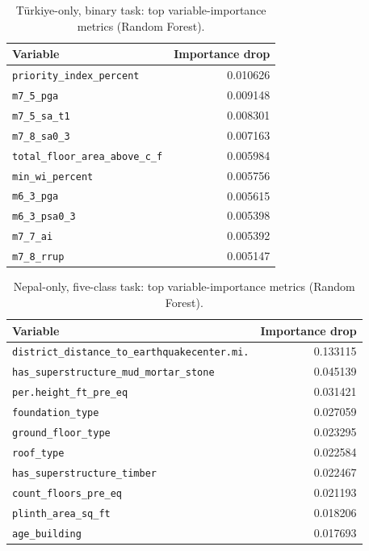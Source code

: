 \documentclass[11pt,a4paper]{article}
\begin{document}
\begin{table}[!h]
\centering
\caption{T\"urkiye-only, binary task: top variable-importance
metrics (Random Forest).}
\label{tab:imp-turkiye-2}
\small
\begin{tabular}{l r}
\toprule
Variable & Importance drop \\
\midrule
\texttt{priority\_index\_percent}     & 0.010626 \\
\texttt{m7\_5\_pga}                    & 0.009148 \\
\texttt{m7\_5\_sa\_t1}                 & 0.008301 \\
\texttt{m7\_8\_sa0\_3}                 & 0.007163 \\
\texttt{total\_floor\_area\_above\_c\_f} & 0.005984 \\
\texttt{min\_wi\_percent}              & 0.005756 \\
\texttt{m6\_3\_pga}                    & 0.005615 \\
\texttt{m6\_3\_psa0\_3}                & 0.005398 \\
\texttt{m7\_7\_ai}                     & 0.005392 \\
\texttt{m7\_8\_rrup}                   & 0.005147 \\
\bottomrule
\end{tabular}
\end{table}

\begin{table}[!h]
\centering
\caption{Nepal-only, five-class task: top variable-importance
metrics (Random Forest).}
\label{tab:imp-nepal-5}
\small
\begin{tabular}{l r}
\toprule
Variable & Importance drop \\
\midrule
\texttt{district\_distance\_to\_earthquakecenter.mi.} & 0.133115 \\
\texttt{has\_superstructure\_mud\_mortar\_stone}      & 0.045139 \\
\texttt{per.height\_ft\_pre\_eq}                       & 0.031421 \\
\texttt{foundation\_type}                              & 0.027059 \\
\texttt{ground\_floor\_type}                           & 0.023295 \\
\texttt{roof\_type}                                    & 0.022584 \\
\texttt{has\_superstructure\_timber}                   & 0.022467 \\
\texttt{count\_floors\_pre\_eq}                        & 0.021193 \\
\texttt{plinth\_area\_sq\_ft}                          & 0.018206 \\
\texttt{age\_building}                                 & 0.017693 \\
\bottomrule
\end{tabular}
\end{table}
\end{document}
